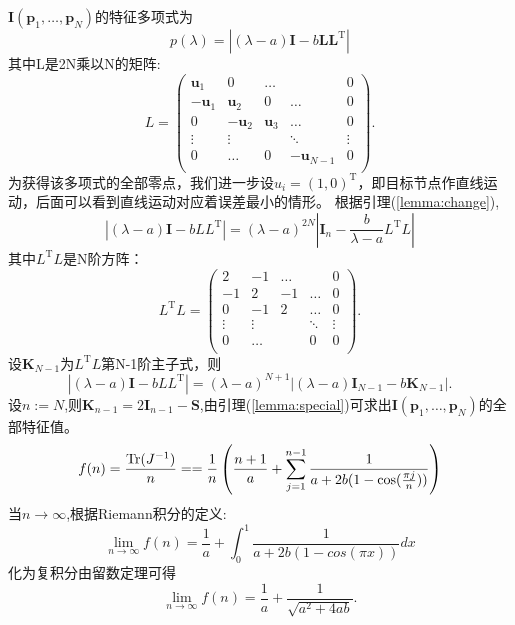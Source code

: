 $\bm{I}(\bm{p}_1,\dots,\bm{p}_N)$的特征多项式为\begin{equation}
p(\lambda)=|(\lambda-a)\bm{I}-b\bm{L}\bm{L}^{\textrm{T}} |
\end{equation}
其中L是2N乘以N的矩阵:
\begin{equation}
L=\left(
\begin{array}{ccccc}
\bm{u}_1&0&\dots&&0\\
-\bm{u}_1&\bm{u}_2&0&\dots&0\\
0&-\bm{u}_2&\bm{u}_3&\dots&0\\
\vdots &\vdots&&\ddots &\vdots\\
0&\dots&0&-\bm{u}_{N-1}&0\\
\end{array}
\right).
\end{equation}
为获得该多项式的全部零点，我们进一步设$u_i=(1,0)^{\textrm{T}} $，即目标节点作直线运动，后面可以看到直线运动对应着误差最小的情形。
根据引理(\ref{lemma:change}),
\begin{equation}
|(\lambda-a)\bm{I}-bLL^{\textrm{T}} |=(\lambda-a)^{2N}|\bm{I}_n-\frac{b}{\lambda-a}L^{\textrm{T}} L|
\end{equation}
其中$L^{\textrm{T}} L$是N阶方阵：
\begin{equation}
L^{\textrm{T}} L=\left(
\begin{array}{ccccc}
2&-1&\dots&&0\\
-1&2&-1&\dots&0\\
0&-1&2&\dots&0\\
\vdots &\vdots&&\ddots &\vdots\\
0&\dots&&0&0\\
\end{array}
\right).
\end{equation}
设$\bm{K}_{N-1}$为$L^{\textrm{T}} L$第N-1阶主子式，则
\begin{equation}
|(\lambda-a)\bm{I}-bLL^{\textrm{T}} |=(\lambda-a)^{N+1}|(\lambda-a)\bm{I}_{N-1}-b\bm{K}_{N-1}|.
\end{equation}
设$n:=N$,则$\bm{K}_{n-1}=2\bm{I}_{n-1}-\bm{S}$,由引理(\ref{lemma:special})可求出$\bm{I}(\bm{p}_1,\dots,\bm{p}_N)$的全部特征值。
\begin{equation}
f(n)=\frac{\operatorname{Tr}(J^{-1})}{n}==\frac{1}{n}\left(\frac{n+1}{a}+\sum_{j=1}^{n-1}\frac{1}{a+2b(1-\cos(\frac{\pi j}{n}))}\right)
\end{equation}
当$n\to \infty$,根据Riemann积分的定义:
\begin{equation}
\lim_{n\rightarrow \infty}f(n)=\frac{1}{a}+\int_0^1 \frac{1}{a+2b(1-cos(\pi x))}dx
\end{equation}
化为复积分由留数定理可得
\begin{equation}\label{eq:a24ab}
\lim_{n\rightarrow \infty}f(n)=\frac{1}{a}+\frac{1}{\sqrt{a^2+4ab}}.
\end{equation}

